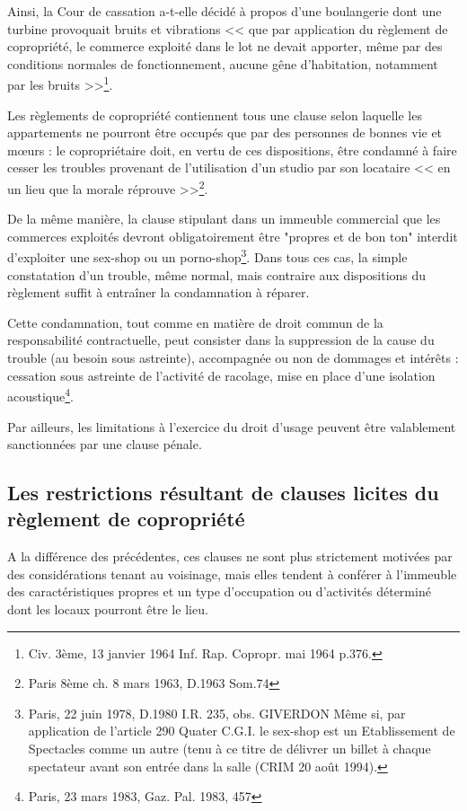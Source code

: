 			Ainsi, la Cour de cassation a-t-elle décidé à propos d'une boulangerie dont une turbine provoquait bruits et vibrations << que par application du règlement de copropriété, le commerce exploité dans le lot ne devait apporter, même par des conditions normales de fonctionnement, aucune gêne d'habitation, notamment par les bruits >>\footnote{Civ. 3ème, 13 janvier 1964 Inf. Rap. Copropr. mai 1964 p.376.}.
			
			Les règlements de copropriété contiennent tous une clause selon laquelle les appartements ne pourront être occupés que par des personnes de bonnes vie et mœurs : le copropriétaire doit, en vertu de ces dispositions, être condamné à faire cesser les troubles provenant de l'utilisation d'un studio par son locataire << en un lieu que la morale réprouve >>\footnote{Paris 8ème ch. 8 mars 1963, D.1963 Som.74}.
			
			De la même manière, la clause stipulant dans un immeuble commercial que les commerces exploités devront obligatoirement être "propres et de bon ton" interdit d'exploiter une sex-shop ou un porno-shop\footnote{Paris, 22 juin 1978, D.1980 I.R. 235, obs. GIVERDON Même si, par application de l’article 290 Quater C.G.I. le sex-shop est un Etablissement de Spectacles comme un autre (tenu à ce titre de délivrer un billet à chaque spectateur avant son entrée dans la salle (CRIM 20 août 1994).}.
			Dans tous ces cas, la simple constatation d'un trouble, même normal, mais contraire aux dispositions du règlement suffit à entraîner la condamnation à réparer.
			
			Cette condamnation, tout comme en matière de droit commun de la responsabilité contractuelle, peut consister dans la suppression de la cause du trouble (au besoin sous astreinte), accompagnée ou non de dommages et intérêts : cessation sous astreinte de l'activité de racolage, mise en place d'une isolation acoustique\footnote{Paris, 23 mars 1983, Gaz. Pal. 1983, 457}.
			
			Par ailleurs, les limitations à l'exercice du droit d'usage peuvent être valablement sanctionnées par une clause pénale.
		
	\subsection{Les restrictions résultant de clauses licites du règlement de copropriété}\label{07_II_B}
		
		A la différence des précédentes, ces clauses ne sont plus strictement motivées par des considérations tenant au voisinage, mais elles tendent à conférer à l'immeuble des caractéristiques propres et un type d'occupation ou d'activités déterminé dont les locaux pourront être le lieu.
		
